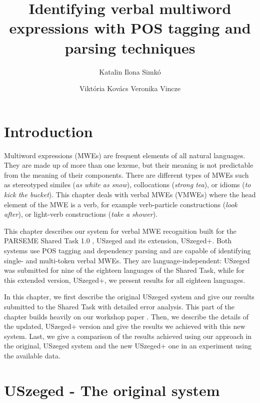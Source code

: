 \documentclass[output=paper,
modfonts,
]{langscibook}
\title{Identifying verbal multiword expressions with POS tagging and parsing techniques}
\author{
 Katalin Ilona Simkó\affiliation{University of Szeged}\and 
 Viktória Kovács\affiliation{University of Szeged}\lastand 
 Veronika Vincze\affiliation{University of Szeged\\MTA-SZTE Research Group on Artificial Intelligence}
}
\begin{document}


\maketitle
\label{SIMKO-CHAPTER}

\section{Introduction} 
Multiword expressions (MWEs) are frequent elements of all natural languages. They are made up of more than one lexeme, but their meaning is not predictable from the meaning of their components. There are different types of MWEs such as stereotyped similes (\textit{as white as snow}), collocations (\textit{strong tea}), or idioms (\textit{to kick the bucket}). This chapter deals with verbal MWEs (VMWEs) where the head element of the MWE is a verb, for example verb-particle constructions (\textit{look after}), or light-verb constructions (\textit{take a shower}). 

This chapter describes our system for verbal MWE recognition built for the PARSEME Shared Task 1.0 \citep{MWEWorkshop}, USzeged
and its extension, USzeged+. Both systems use POS tagging and dependency parsing and are capable of identifying single- and multi-token verbal MWEs. They are language-independent: USzeged was submitted for nine of the eighteen languages of the Shared Task, while for this extended version, USzeged+, we present results for all eighteen languages. 

In this chapter, we first describe the original USzeged system and give our results submitted to the Shared Task with detailed error analysis. This part of the chapter builds heavily on our workshop paper \citep{Simko2017}. Then, we describe the details of the updated, USzeged+ version and give the results we achieved with this new system. Last, we give a comparison of the results achieved using our approach in the original, USzeged system and the new USzeged+ one in an experiment using the available  data.

\section{USzeged - The original system}
\end{document}
